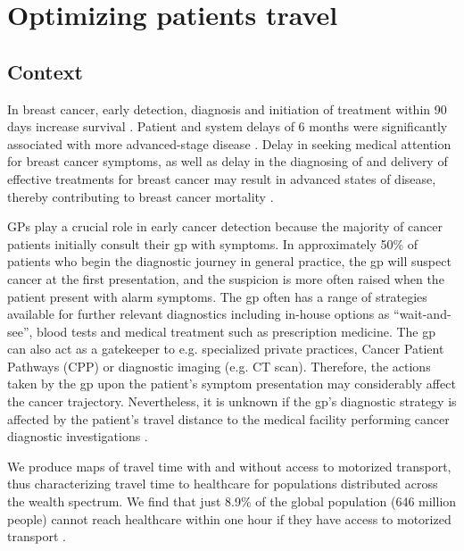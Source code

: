\chapter{Optimizing patients travel}

\section{Context}

In breast cancer, early detection, diagnosis and initiation of treatment within 90 days increase survival \cite{williams_assessment_2015}.
Patient and system delays of 6 months were significantly associated with more advanced-stage disease \cite{pace_delays_2015}.
Delay in seeking medical attention for breast cancer symptoms, as well as delay in the diagnosing of and delivery of effective treatments for breast cancer may result in advanced states of disease, thereby contributing to breast cancer mortality \cite{caplan_delay_1992}.

GPs play a crucial role in early cancer detection because the majority of cancer patients initially consult their \ac{gp} with symptoms. In approximately 50\% of patients who begin the diagnostic journey in general practice, the \ac{gp} will suspect cancer at the first presentation, and the suspicion is more often raised when the patient present with alarm symptoms. The \ac{gp} often has a range of strategies available for further relevant diagnostics including in-house options as ``wait-and-see'', blood tests and medical treatment such as prescription medicine. The \ac{gp} can also act as a gatekeeper to e.g. specialized private practices, Cancer Patient Pathways (CPP) or diagnostic imaging (e.g. CT scan). Therefore, the actions taken by the \ac{gp} upon the patient's symptom presentation may considerably affect the cancer trajectory. Nevertheless, it is unknown if the \ac{gp}'s diagnostic strategy is affected by the patient's travel distance to the medical facility performing cancer diagnostic investigations \cite{flytkjaer_virgilsen_cancer_2019}.

We produce maps of travel time with and without access to motorized transport, thus characterizing travel time to healthcare for populations distributed across the wealth spectrum. We find that just 8.9\% of the global population (646 million people) cannot reach healthcare within one hour if they have access to motorized transport \cite{weiss_global_2020}.

